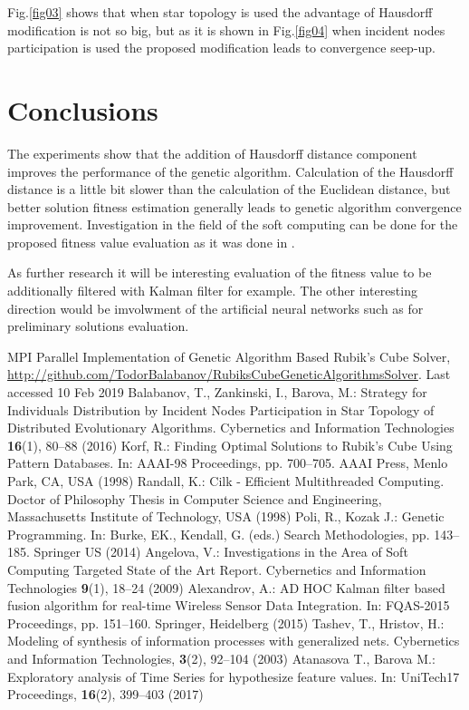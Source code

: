 \documentclass[runningheads]{llncs}
\begin{document}
Fig.\ref{fig03} shows that when star topology is used the advantage of Hausdorff modification is not so big, but as it is shown in Fig.\ref{fig04} when incident nodes participation is used the proposed modification leads to convergence seep-up.

\section{Conclusions}

The experiments show that the addition of Hausdorff distance component improves the performance of the genetic algorithm. Calculation of the Hausdorff distance is a little bit slower than the calculation of the Euclidean distance, but better solution fitness estimation generally leads to genetic algorithm convergence improvement. Investigation in the field of the soft computing can be done for the proposed fitness value evaluation as it was done in \cite{angelova01}.

As further research it will be interesting evaluation of the fitness value to be additionally filtered with Kalman filter \cite{alexandrov01} for example. The other interesting direction would be imvolwment of the artificial neural networks such as \cite{tashev01,atanasova01} for preliminary solutions evaluation.

\begin{thebibliography}{8}
MPI Parallel Implementation of Genetic Algorithm Based Rubik’s Cube Solver, \url{http://github.com/TodorBalabanov/RubiksCubeGeneticAlgorithmsSolver}. Last accessed 10 Feb 2019
Balabanov, T., Zankinski, I., Barova, M.: Strategy for Individuals Distribution by Incident Nodes Participation in Star Topology of Distributed Evolutionary Algorithms. Cybernetics and Information Technologies \textbf{16}(1), 80--88 (2016)
Korf, R.: Finding Optimal Solutions to Rubik’s Cube Using Pattern Databases. In: AAAI-98 Proceedings, pp. 700--705. AAAI Press, Menlo Park, CA, USA (1998)
Randall, K.: Cilk - Efficient Multithreaded Computing. Doctor of Philosophy Thesis in Computer Science and Engineering, Massachusetts Institute of Technology, USA (1998) 
Poli, R., Kozak J.: Genetic Programming. In: Burke, EK., Kendall, G. (eds.) Search Methodologies, pp. 143--185. Springer US (2014)
Angelova, V.: Investigations in the Area of Soft Computing Targeted State of the Art Report. Cybernetics and Information Technologies \textbf{9}(1), 18--24 (2009)
Alexandrov, A.: AD HOC Kalman filter based fusion algorithm for real-time Wireless Sensor Data Integration. In: FQAS-2015 Proceedings, pp. 151--160. Springer, Heidelberg (2015)
Tashev, T., Hristov, H.: Modeling of synthesis of information processes with generalized nets. Cybernetics and Information Technologies, \textbf{3}(2), 92--104 (2003) 
Atanasova T., Barova M.: Exploratory analysis of Time Series for hypothesize feature values. In: UniTech17 Proceedings,  \textbf{16}(2), 399--403 (2017)
\end{thebibliography}
\end{document}
